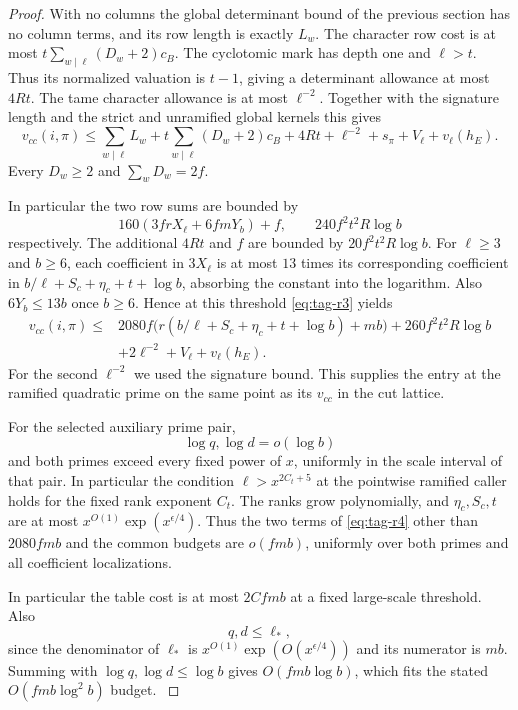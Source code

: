 \begin{proof}
With no columns the global determinant bound of the
previous section has no column terms, and its row
length is exactly \(L_w\). The character row cost is
at most \(t\sum_{w\mid\ell}(D_w+2)c_B\).
The cyclotomic mark has depth one and \(\ell>t\).
Thus its normalized valuation is \(t-1\), giving a
determinant allowance at most \(4Rt\). The tame
character allowance is at most \(\ell^{-2}\). Together
with the signature length and the strict and unramified
global kernels this gives
\[
 v_{cc}(i,\pi)\le
 \sum_{w\mid\ell} L_w+t\sum_{w\mid\ell}(D_w+2)c_B
   +4Rt+\ell^{-2}+s_\pi+V_\ell+v_\ell(h_E).
 \tag{R3}\label{eq:tag-r3}
\]
Every \(D_w\ge2\) and \(\sum_wD_w=2f\).

In particular the two row sums are bounded by
\[
 160(3fr X_\ell+6fm Y_b)+f,\qquad
 240 f^2t^2R\log b
\]
respectively. The additional \(4Rt\) and \(f\)
are bounded by \(20 f^2t^2R\log b\).
For \(\ell\ge3\) and \(b\ge6\), each coefficient
in \(3X_\ell\) is at most \(13\) times its
corresponding coefficient in
\(b/\ell+S_c+\eta_c+t+\log b\), absorbing the constant
into the logarithm. Also \(6Y_b\le13b\) once \(b\ge6\).
Hence at this
threshold \eqref{eq:tag-r3} yields
\[
 \begin{split}
 v_{cc}(i,\pi)\le{}&
 2080 f\bigl(r(b/\ell+S_c+\eta_c+t+\log b)+mb\bigr)
     +260 f^2t^2R\log b\\
 &+2\ell^{-2}+V_\ell+v_\ell(h_E).
 \end{split}
 \tag{R4}\label{eq:tag-r4}
\]
For the second \(\ell^{-2}\) we used the signature
bound. This supplies the entry at the ramified quadratic prime on the same point
as its \(v_{cc}\) in the cut lattice.

For the selected auxiliary prime pair,
\[
 \log q,\log d=o(\log b)
\]
and both primes exceed
every fixed power of \(x\), uniformly in the scale
interval of that pair. In particular the condition
\(\ell>x^{2C_t+5}\) at the pointwise ramified caller
holds for the fixed rank exponent \(C_t\).
The ranks grow polynomially,
and \(\eta_c,S_c,t\) are at most
\(x^{O(1)}\exp(x^{\epsilon/4})\).
Thus the two terms of \eqref{eq:tag-r4} other than \(2080fmb\)
and the common budgets are \(o(fmb)\), uniformly
over both primes and all coefficient localizations.

In particular the table cost is at most \(2Cfmb\)
at a fixed large-scale threshold.
Also
\[
 q,d\le\ell_*,
\]
since the denominator of
\(\ell_*\) is \(x^{O(1)}\exp(O(x^{\epsilon/4}))\)
and its numerator is \(mb\). Summing with
\(\log q,\log d\le\log b\) gives \(O(fmb\log b)\),
which fits the stated \(O(fmb\log^2 b)\) budget.
\label{cor:special-prime-lengths-10}
\end{proof}

